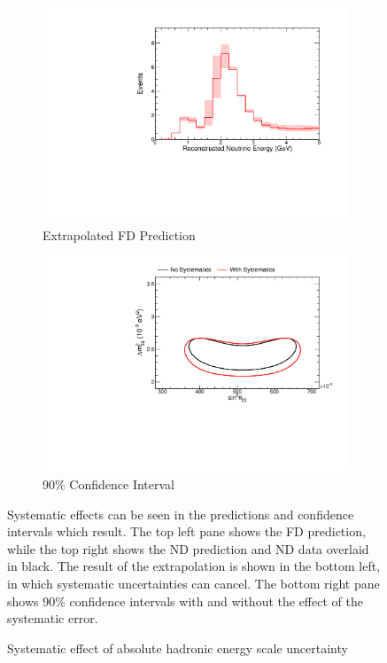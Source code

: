 {\begin{figure}
\begin{center}
\begin{subfigure}[c]{0.49\textwidth}
\includegraphics[width=\textwidth]{figures/systs/prediction/fd_extrap_prediction_hadEAbs.pdf}
\caption*{Extrapolated FD Prediction}
\end{subfigure}
\begin{subfigure}[c]{0.49\textwidth}
\includegraphics[width=\textwidth]{figures/systs/prediction/fd_extrap_contour_hadEAbs.pdf}
\caption*{90\% Confidence Interval}
\end{subfigure}
\end{center}
\caption{Systematic effect of absolute hadronic energy scale uncertainty}{
Systematic effects can be seen in the predictions and confidence intervals
which result.
The top left pane shows the FD prediction, while the top right shows the
ND prediction and ND data overlaid in black.
The result of the extrapolation is shown in the bottom left, in which
systematic uncertainties can cancel.
The bottom right pane shows 90\% confidence intervals with and without
the effect of the systematic error.}
\label{syst_fig_hadEAbs}


\end{figure}}
